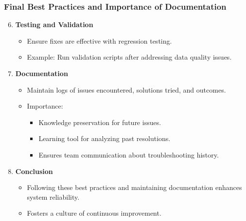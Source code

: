 \documentclass[aspectratio=169]{beamer}
\begin{document}
\begin{frame}[fragile]
    \frametitle{Final Best Practices and Importance of Documentation}
    \begin{enumerate}
        \setcounter{enumi}{5} %
        \item \textbf{Testing and Validation}
        \begin{itemize}
            \item Ensure fixes are effective with regression testing.
            \item Example: Run validation scripts after addressing data quality issues.
        \end{itemize}

        \item \textbf{Documentation}
        \begin{itemize}
            \item Maintain logs of issues encountered, solutions tried, and outcomes.
            \item Importance:
            \begin{itemize}
                \item Knowledge preservation for future issues.
                \item Learning tool for analyzing past resolutions.
                \item Ensures team communication about troubleshooting history.
            \end{itemize}
        \end{itemize}

        \item \textbf{Conclusion}
        \begin{itemize}
            \item Following these best practices and maintaining documentation enhances system reliability.
            \item Fosters a culture of continuous improvement.
        \end{itemize}
    \end{enumerate}
\end{frame}
\end{document}
